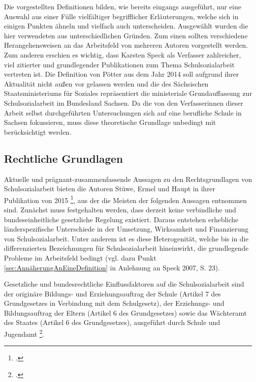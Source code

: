 Die vorgestellten Definitionen bilden, wie bereits eingangs ausgeführt, nur eine Auswahl aus einer Fülle vielfältiger begrifflicher Erläuterungen, welche sich in einigen Punkten ähneln und vielfach auch unterscheiden. Ausgewählt wurden die hier verwendeten aus unterschiedlichen Gründen. Zum einen sollten verschiedene Herangehensweisen an das Arbeitsfeld von mehreren Autoren vorgestellt werden. Zum anderen erschien es wichtig, dass Karsten Speck als Verfasser zahlreicher, viel zitierter und grundlegender Publikationen zum Thema Schulsozialarbeit vertreten ist. Die Definition von Pötter aus dem Jahr 2014 soll aufgrund ihrer Aktualität nicht außen vor gelassen werden und die des Sächsischen Staatsministeriums für Soziales repräsentiert die ministeriale Grundauffassung zur Schulsozialarbeit im Bundesland Sachsen. Da die von den Verfasserinnen dieser Arbeit selbst durchgeführten Untersuchungen sich auf eine berufliche Schule in Sachsen fokussieren, muss diese theoretische Grundlage unbedingt mit berücksichtigt werden. 

\subsection{Rechtliche Grundlagen}
\label{sec:RechtlicheGrundlagen}

Aktuelle und prägnant-zusammenfassende Aussagen zu den Rechtsgrundlagen von Schulsozialarbeit bieten die Autoren Stüwe, Ermel und Haupt in ihrer Publikation von 2015 \footcite[24ff]{Stuewe2015}, aus der die Meisten der folgenden Aussagen entnommen sind. Zunächst muss festgehalten werden, dass derzeit keine verbindliche und bundeseinheitliche gesetzliche Regelung existiert. Daraus entstehen erhebliche länderspezifische Unterschiede in der Umsetzung, Wirksamkeit und Finanzierung von Schulsozialarbeit. Unter anderem ist es diese Heterogenität, welche bis in die differenzierten Bezeichnungen für Schulsozialarbeit hineinwirkt, die grundlegende Probleme im Arbeitsfeld bedingt (vgl. dazu Punkt \ref{sec:AnnäherungAnEineDefinition} in Anlehnung an Speck 2007, S. 23).
 
Gesetzliche und bundesrechtliche Einflussfaktoren auf die Schulsozialarbeit sind der originäre Bildungs- und Erziehungsauftrag der Schule (Artikel 7 des Grundgesetzes in Verbindung mit dem Schulgesetz), der Erziehungs- und Bildungsauftrag der Eltern (Artikel 6 des Grundgesetzes) sowie das Wächteramt des Staates (Artikel 6 des Grundgesetzes), ausgeführt durch Schule und Jugendamt \footcite[vgl.][25]{Stuewe2015}.

